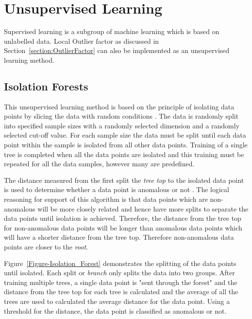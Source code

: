 \section{Unsupervised Learning}
Supervised learning is a subgroup of machine learning which is based on unlabelled data. Local Outlier factor as discussed in Section~\ref{section:OutlierFactor} can also be implemented as an unsupervised learning method.

\subsection{Isolation Forests}
This unsupervised learning method is based on the principle of isolating data points by slicing the data with random conditions \cite{TonyLiu2008}. The data is randomly split into specified sample sizes with a randomly selected dimension and a randomly selected cut-off value. For each sample size the data must be split until each data point within the sample is isolated from all other data points. Training of a single tree is completed when all the data points are isolated and this training must be repeated for all the data samples, however many are predefined. 

The distance measured from the first split the \emph{tree top} to the isolated data point is used to determine whether a data point is anomalous or not \cite{Hariri2021}. The logical reasoning for support of this algorithm is that data points which are non-anomalous will be more closely related and hence have more splits to separate the data points until isolation is achieved. Therefore, the distance from the tree top for non-anomalous data points will be longer than anomalous data points which will have a shorter distance from the tree top. Therefore non-anomalous data points are closer to the \emph{root}. 

Figure~\ref{Figure-Isolation_Forest} demonstrates the splitting of the data points until isolated. Each split or \emph{branch} only splits the data into two groups. After training multiple trees, a single data point is "sent through the forest" and the distance from the tree top for each tree is calculated and the average of all the trees are used to calculated the average distance for the data point. Using a threshold for the distance, the data point is classified as anomalous or not.

